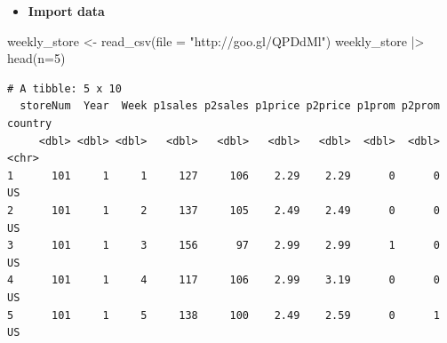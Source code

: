\documentclass[
  ignorenonframetext,
]{beamer}
\newenvironment{Shaded}{\begin{snugshade}}{\end{snugshade}}
\newcommand{\AttributeTok}[1]{\textcolor[rgb]{0.40,0.45,0.13}{#1}}
\newcommand{\DecValTok}[1]{\textcolor[rgb]{0.68,0.00,0.00}{#1}}
\newcommand{\FunctionTok}[1]{\textcolor[rgb]{0.28,0.35,0.67}{#1}}
\newcommand{\NormalTok}[1]{\textcolor[rgb]{0.00,0.23,0.31}{#1}}
\newcommand{\OtherTok}[1]{\textcolor[rgb]{0.00,0.23,0.31}{#1}}
\newcommand{\SpecialCharTok}[1]{\textcolor[rgb]{0.37,0.37,0.37}{#1}}
\newcommand{\StringTok}[1]{\textcolor[rgb]{0.13,0.47,0.30}{#1}}
\providecommand{\tightlist}{%
  \setlength{\itemsep}{0pt}\setlength{\parskip}{0pt}}\usepackage{longtable,booktabs,array}
\begin{document}
\begin{frame}[fragile]{}
\label{section-3}
\begin{itemize}
\tightlist
\item
  \textbf{Import data}
\end{itemize}

\tiny

\begin{Shaded}
\begin{Highlighting}[]
\NormalTok{weekly\_store }\OtherTok{\textless{}{-}} \FunctionTok{read\_csv}\NormalTok{(}\AttributeTok{file =} \StringTok{"http://goo.gl/QPDdMl"}\NormalTok{)}
\NormalTok{weekly\_store }\SpecialCharTok{|\textgreater{}} \FunctionTok{head}\NormalTok{(}\AttributeTok{n=}\DecValTok{5}\NormalTok{)}
\end{Highlighting}
\end{Shaded}

\begin{verbatim}
# A tibble: 5 x 10
  storeNum  Year  Week p1sales p2sales p1price p2price p1prom p2prom country
     <dbl> <dbl> <dbl>   <dbl>   <dbl>   <dbl>   <dbl>  <dbl>  <dbl> <chr>  
1      101     1     1     127     106    2.29    2.29      0      0 US     
2      101     1     2     137     105    2.49    2.49      0      0 US     
3      101     1     3     156      97    2.99    2.99      1      0 US     
4      101     1     4     117     106    2.99    3.19      0      0 US     
5      101     1     5     138     100    2.49    2.59      0      1 US     
\end{verbatim}
\end{frame}
\end{document}
